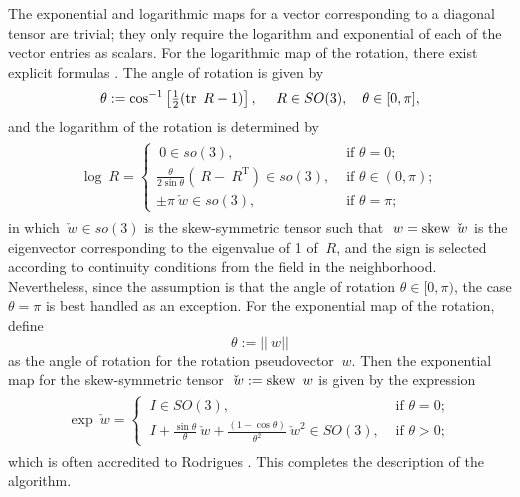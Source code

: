 \documentclass{article}
\renewcommand{\skew}{\op{skew}}
\begin{document}
The exponential and logarithmic maps for a vector corresponding to a
diagonal tensor are trivial; they only require the logarithm and
exponential of each of the vector entries as scalars. For the
logarithmic map of the rotation, there exist explicit formulas
\autocite{Park.Ravani:1997}. The angle of rotation is given by
\begin{equation}
  \theta := \cos^{-1} \left[  \tfrac{1}{2} (\operatorname{\text{tr}} ~R - 1) \right],
  \quad
  ~R \in SO(3),
  \quad
  \theta \in [0, \pi],
\end{equation}
and the logarithm of the rotation is determined by
\begin{equation} \label{eq:log-rotation}
  \begin{split}
    \begin{aligned}
      \log ~R =
      \begin{cases}
        ~0 \in so(3),
        &
        \text{ if }\theta = 0;
        \\[0.4em]
        \displaystyle{
          \frac{\theta}{2 \sin \theta} (~R - ~R^\text{T}) \in so(3),
        }
        &
        \text{ if }\theta \in (0, \pi);
        \\[0.7em]
        \pm \pi \check{~w} \in so(3),
        &
        \text{ if }\theta = \pi;
      \end{cases}
    \end{aligned}
  \end{split}
\end{equation}
in which $\check{~w} \in so(3)$ is the skew-symmetric tensor such that
$~w = \skew \check{~w}$ is the eigenvector corresponding to the
eigenvalue of 1 of $~R$, and the sign is selected according to
continuity conditions from the field in the
neighborhood. Nevertheless, since the assumption is that the angle of
rotation $\theta \in [0, \pi)$, the case $\theta = \pi$ is best
handled as an exception. For the exponential map of the rotation, define
\begin{equation} \label{eq:angle-as-norm-skew}
  \theta := ||~w||
\end{equation}
as the angle of rotation for the rotation pseudovector $~w$. Then the
exponential map for the skew-symmetric tensor $\check{~w} := \skew ~w$
is given by the expression
\begin{equation} \label{eq:Rodrigues-formula}
  \begin{split}
    \begin{aligned}
      \exp \check{~w} =
      \begin{cases}
        ~I \in SO(3),
        &
        \text{ if }\theta = 0;
        \\
        \displaystyle{
          ~I + \frac{\sin \theta}{\theta} \check{~w} +
          \frac{(1 - \cos \theta)}{\theta^2} \check{~w}^2 \in SO(3),
        }
        &
        \text{ if }\theta > 0;
      \end{cases}
    \end{aligned}
  \end{split}
\end{equation}
which is often accredited to Rodrigues \autocite{Gallier:2011}. This
completes the description of the algorithm.

\printbibliography
\end{document}
